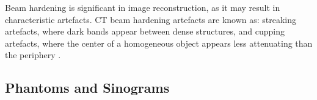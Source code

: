 \documentclass{article}
\begin{document}
Beam hardening is significant in image reconstruction, as it may result in characteristic artefacts. CT beam hardening artefacts are known as: streaking artefacts, where dark bands appear between dense structures, and cupping artefacts, where the center of a homogeneous object appears less attenuating than the periphery \cite{Murphy_2016}.

\subsection{Phantoms and Sinograms}



\end{document}
